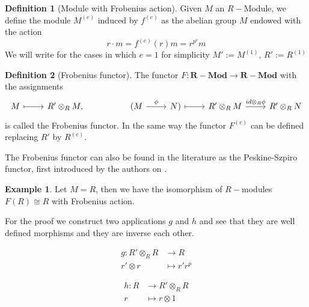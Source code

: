 \documentclass[leqno]{article}
\theoremstyle{definition}
\newtheorem{definition}{Definition}[section]
\newtheorem{example}{Example}[section]
\newcommand{\catname}[1]{{\mathbf{#1}}}
\newcommand{\Mod}{\catname{R-Mod}}
\begin{document}
\begin{definition}[Module with Frobenius action] Given $M$ an  $R-$Module, we define the module  $M^{(e)}$ induced by  $f^{(e)}$ as the abelian group $M$ endowed with the action
  \[
  r \cdot  m  = f ^{(e)}(r)m = r ^{p^e} m
  \] 
We will write for the cases in which $e=1$ for simplicity $M':=M ^{(1)}$, $R':=R ^{(1)}$
\end{definition}


\begin{definition}[Frobenius functor] The functor $F:\Mod \to \Mod$ with the assignments 
\[\begin{tikzcd}
	M & {R'\otimes_RM,} && {(M} & {N)} & {R'\otimes_R M} & {R'\otimes_RN}
	\arrow["\phi", from=1-4, to=1-5]
	\arrow["{id\otimes_R\phi}", from=1-6, to=1-7]
	\arrow[maps to, from=1-5, to=1-6]
	\arrow[maps to, from=1-1, to=1-2]
\end{tikzcd}\]
is called the Frobenius functor. In the same way the functor $F ^{(e)}$ can be defined replacing $R'$ by  $R ^{(e)}$.
\end{definition}

The Frobenius functor can also be found in the literature as the Peskine-Szpiro functor, first introduced by the authors on \cite{pesk}.

\begin{example} Let $M = R$, then we have the isomorphism of $R-$modules $F(R) \cong R$ with Frobenius action.

For the proof we construct two applications $g$ and  $h$ and see that they are well defined morphisms and they are inverse each other.

 \begin{minipage}{0.5\textwidth}
   \begin{align*}
	 g: R'\otimes _R R &\to  R \\
	 r'\otimes r &\mapsto r'r^p
   \end{align*}
\end{minipage}
\begin{minipage}{0.5\textwidth}
\begin{align*}
  h: R &\to  R'\otimes_R R\\
  r&\mapsto r\otimes 1
\end{align*}
\end{minipage}
\end{example}
\end{document}
